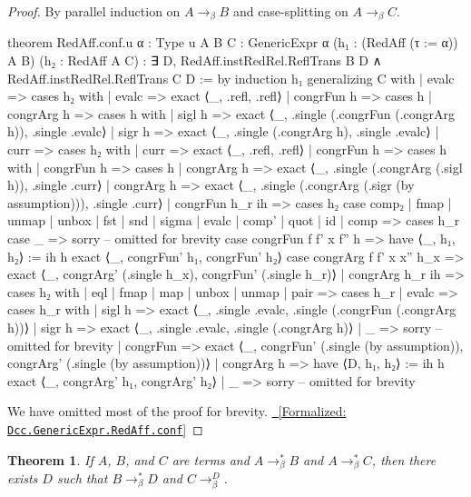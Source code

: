 \documentclass{article}
\newtheorem{theorem}{Theorem}
\newcommand{\leanlink}[2]{
  \hfill \href{#1}{\textcolor{leanblue}\faCheckSquare~[Formalized: \texttt{#2}]}%
}
\newcommand{\arr}{\rightarrow}
\newcommand{\barr}{\arr_{\beta}}
\begin{document}
\begin{proof}
By parallel induction on \(A \barr B\) and case-splitting on \(A \barr C\).
\begin{leancode}

theorem RedAff.conf.{u} {α : Type u} {A B C : GenericExpr α} (h₁ : (RedAff (τ := α)) A B) (h₂ : RedAff A C) : ∃ D, RedAff.instRedRel.ReflTrans B D ∧ RedAff.instRedRel.ReflTrans C D := by
  induction h₁ generalizing C with
  | evalc =>
    cases h₂ with
    | evalc => exact ⟨_, .refl, .refl⟩
    | congrFun h => cases h
    | congrArg h =>
      cases h with
      | sigl h => exact ⟨_, .single (.congrFun (.congrArg h)), .single .evalc⟩
      | sigr h => exact ⟨_, .single (.congrArg h), .single .evalc⟩
  | curr =>
    cases h₂ with
    | curr => exact ⟨_, .refl, .refl⟩
    | congrFun h =>
      cases h with
      | congrFun h => cases h
      | congrArg h => exact ⟨_, .single (.congrArg (.sigl h)), .single .curr⟩
    | congrArg h => exact ⟨_, .single (.congrArg (.sigr (by assumption))), .single .curr⟩
  | congrFun h_r ih =>
    cases h₂
    case comp₂ | fmap | unmap | unbox | fst | snd | sigma | evalc | comp' | quot | id | comp => cases h_r
    case _ => sorry -- omitted for brevity
    case congrFun f f' x f'' h =>
      have ⟨_, h₁, h₂⟩ := ih h
      exact ⟨_, congrFun' h₁, congrFun' h₂⟩
    case congrArg f f' x x'' h_x =>
      exact ⟨_, congrArg' (.single h_x), congrFun' (.single h_r)⟩
  | congrArg h_r ih =>
    cases h₂ with
    | eql
    | fmap
    | map | unbox | unmap
    | pair => cases h_r
    | evalc => cases h_r with
      | sigl h => exact ⟨_, .single .evalc, .single (.congrFun (.congrArg h))⟩
      | sigr h => exact ⟨_, .single .evalc, .single (.congrArg h)⟩
    | _ => sorry -- omitted for brevity
    | congrFun => exact ⟨_, congrFun' (.single (by assumption)), congrArg' (.single (by assumption))⟩
    | congrArg h =>
      have ⟨D, h₁, h₂⟩ := ih h
      exact ⟨_, congrArg' h₁, congrArg' h₂⟩
  | _ => sorry -- omitted for brevity
\end{leancode}
We have omitted most of the proof for brevity.\hfill \leanlink{https://github.com/lexzaiello/DCC/blob/7b316fc3eb8aac4736e30d5e9a58918d5215c334/Dcc/Aff/Red.lean\#L163}{Dcc.GenericExpr.RedAff.conf}
\end{proof}

\begin{theorem} \label{thm:confglobal}
  If \(A\), \(B\), and \(C\) are terms and \(A \barr^{*} B\) and \(A \barr^{*} C\), then there exists \(D\) such that \(B \barr^{*} D\) and \(C \barr^{D}\).
\end{theorem}
\end{document}
